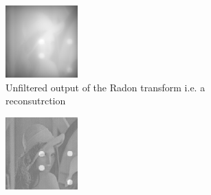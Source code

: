 \begin{figure}
  \centering
  \hfill
  \begin{subfigure}[t]{0.3\textwidth}
    \includegraphics[width=\textwidth]{Chapters/flopt/Figs/PDF/results/no_helix/iradon_nofilter}
    \caption[Unfiltered iRadon]{Unfiltered output of the \gls{Radon transform} i.e. a reconsutrction}
    \label{fig:iradon_nofilter}
  \end{subfigure}\hfill
  \begin{subfigure}[t]{0.3\textwidth}
    \includegraphics[width=\textwidth]{Chapters/flopt/Figs/PDF/results/no_helix/iradon_filter}

\end{subfigure}
\end{figure}
